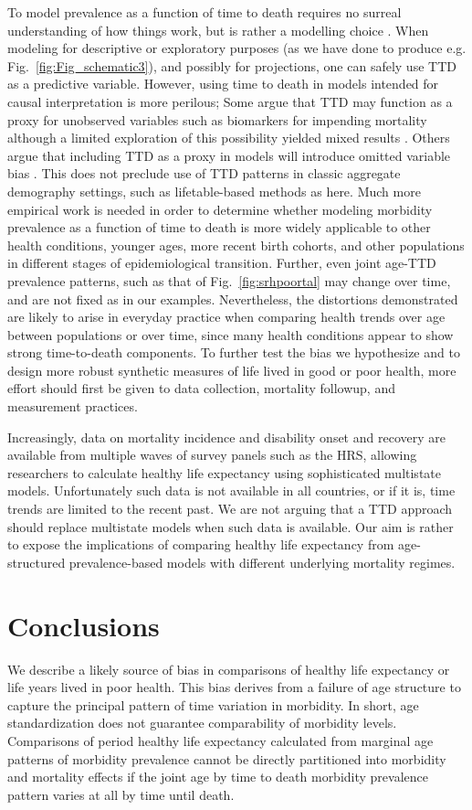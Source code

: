 \documentclass[12pt,oneside,letterpaper,doublespacing]{article}  %
\begin{document}
To model prevalence as a function of
time to death requires no surreal understanding of how things work, but is
rather a modelling choice \citep{wolf2015disability}. When modeling for
descriptive or exploratory purposes (as we have done to produce e.g. Fig.~\ref{fig:Fig_schematic3}),
and possibly for projections, one can safely use
TTD as a predictive variable.
However, using time to death in models intended for causal interpretation is more perilous; Some argue that TTD may function as a proxy for unobserved variables such as biomarkers for impending mortality \citep{wolf2015disability} although a limited exploration of this possibility yielded mixed results \citep{rehkopf2016cross}. Others argue that including TTD as a proxy in models will introduce omitted variable bias \citep{lynch2015commentary}. This does not preclude use of TTD patterns in classic aggregate demography settings, such as lifetable-based methods as here. Much more empirical work is needed in order to determine whether modeling morbidity
prevalence as a function of time to death is more widely applicable to
other health conditions, younger ages, more recent birth
cohorts, and other populations in different stages of epidemiological
transition. Further, even joint age-TTD prevalence patterns, such as that of Fig.~\ref{fig:srhpoortal} may change over time, and are not fixed as in our examples. Nevertheless, the distortions demonstrated are likely to arise in everyday practice when comparing health trends over age between populations or over time, since many health conditions appear to show strong time-to-death components. To further test the bias we hypothesize and to design more robust synthetic measures of life lived in good or poor health, more effort should first be given to data collection, mortality followup, and measurement practices.

Increasingly, data on mortality incidence and disability onset and recovery are available from
multiple waves of survey panels such as the HRS, allowing researchers to
calculate healthy life expectancy using sophisticated multistate models.
Unfortunately such data is not available in all countries, or if it is, time
trends are limited to the recent past. We are not arguing that a TTD approach
should replace multistate models when such data is available. Our aim is rather
to expose the implications of comparing healthy life expectancy from
age-structured prevalence-based models with different underlying mortality
regimes.

\section{Conclusions}
We describe a likely source of bias in comparisons of healthy life expectancy or life years lived in poor health. This bias derives from a failure of age structure to capture the principal pattern of time variation in morbidity. In short, age standardization does not guarantee comparability of morbidity levels. Comparisons of period healthy life expectancy calculated from marginal age patterns of morbidity prevalence cannot be directly partitioned into morbidity and mortality effects if the joint age by time to death morbidity prevalence pattern varies at all by time until death. 
\end{document}
